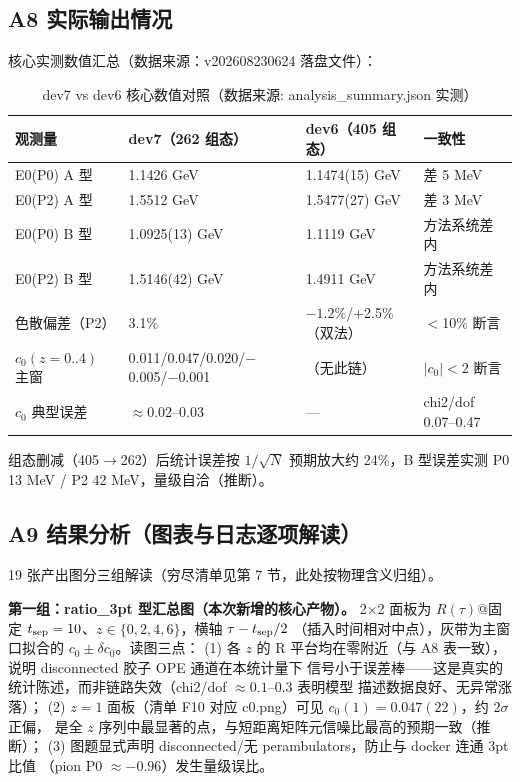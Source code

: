 \documentclass[UTF8]{ctexart}
\begin{document}
\subsection{A8 实际输出情况}
核心实测数值汇总（数据来源：v202608230624 落盘文件）：

\begin{table}[htbp]\centering
\begin{tabular}{llll}
\toprule
观测量 & dev7（262 组态） & dev6（405 组态） & 一致性 \\
\midrule
E0(P0) A 型 & 1.1426 GeV & 1.1474(15) GeV & 差 5 MeV \\
E0(P2) A 型 & 1.5512 GeV & 1.5477(27) GeV & 差 3 MeV \\
E0(P0) B 型 & 1.0925(13) GeV & 1.1119 GeV & 方法系统差内 \\
E0(P2) B 型 & 1.5146(42) GeV & 1.4911 GeV & 方法系统差内 \\
色散偏差（P2） & 3.1\% & $-1.2\%$/+2.5\%（双法） & $<$10\% 断言 \\
$c_0(z{=}0..4)$ 主窗 & 0.011/0.047/0.020/$-$0.005/$-$0.001 & （无此链） & $|c_0|<2$ 断言 \\
$c_0$ 典型误差 & $\approx$0.02--0.03 & --- & chi2/dof 0.07--0.47 \\
\bottomrule
\end{tabular}
\caption{dev7 vs dev6 核心数值对照（数据来源: analysis\_summary.json 实测）}
\end{table}

组态删减（405$\to$262）后统计误差按 $1/\sqrt{N}$ 预期放大约 24\%，B 型误差实测
P0 13 MeV / P2 42 MeV，量级自洽（推断）。

\subsection{A9 结果分析（图表与日志逐项解读）}
19 张产出图分三组解读（穷尽清单见第 7 节，此处按物理含义归组）。

\textbf{第一组：ratio\_3pt 型汇总图（本次新增的核心产物）。}
2$\times$2 面板为 $R(\tau)$@固定 $t_{\rm sep}=10$、$z\in\{0,2,4,6\}$，横轴 $\tau-t_{\rm sep}/2$
（插入时间相对中点），灰带为主窗口拟合的 $c_0\pm\delta c_0$。读图三点：
(1) 各 $z$ 的 R 平台均在零附近（与 A8 表一致），说明 disconnected 胶子 OPE 通道在本统计量下
信号小于误差棒——这是真实的统计陈述，而非链路失效（chi2/dof $\approx0.1$--$0.3$ 表明模型
描述数据良好、无异常涨落）；
(2) $z=1$ 面板（清单 F10 对应 c0.png）可见 $c_0(1)=0.047(22)$，约 2$\sigma$ 正偏，
是全 $z$ 序列中最显著的点，与短距离矩阵元信噪比最高的预期一致（推断）；
(3) 图题显式声明 disconnected/无 perambulators，防止与 docker 连通 3pt 比值
（pion P0 $\approx-0.96$）发生量级误比。
\end{document}
